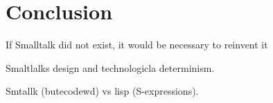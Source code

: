 \section{Conclusion}

If Smalltalk did not exist, it would be necessary to reinvent it


Smaltlalks design and technologicla determinism.

Smtallk (butecodewd) vs lisp (S-expressions).

